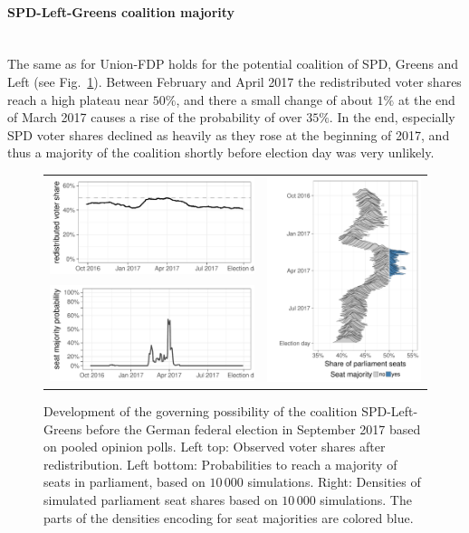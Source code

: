\documentclass[smallcondensed]{svjour3}     %
\begin{document}
\paragraph{SPD-Left-Greens coalition majority} \ \\
The same as for Union-FDP holds for the potential coalition of
SPD, Greens and Left (see Fig.~\ref{fig:2017_spdleftgreens}).
Between February and April 2017 the redistributed voter
shares reach a high plateau near $50\%$, and there a small change
of about $1\%$ at the end of March 2017 causes a rise of
the probability of over $35\%$.
In the end, especially SPD voter shares declined as heavily as
they rose at the beginning of 2017, and thus a majority of
the coalition shortly before election day was very unlikely.

\begin{figure}[H]\centering
\begin{tabular}{ll}
\includegraphics[height=.15\textwidth]{figures/2017_pooled_spdleftgreens_rawSharesRedist.pdf}
&
\multirow{2}{*}[13ex]{\includegraphics[height=30ex]{figures/2017_pooled_spdleftgreens_ridgeline.pdf}}
\\
\includegraphics[height=.15\textwidth]{figures/2017_pooled_spdleftgreens_prob.pdf}
\end{tabular}
\caption{Development of the governing possibility of the coalition SPD-Left-Greens before the German federal election in September 2017 based on pooled opinion polls.
Left top: Observed voter shares after redistribution. Left bottom: Probabilities to reach a majority of seats in parliament, based on $10\,000$ simulations. Right: Densities of simulated parliament seat shares based on $10\,000$ simulations. The parts of the densities encoding for seat majorities are colored blue.
\label{fig:2017_spdleftgreens}
}
\end{figure}
\end{document}

